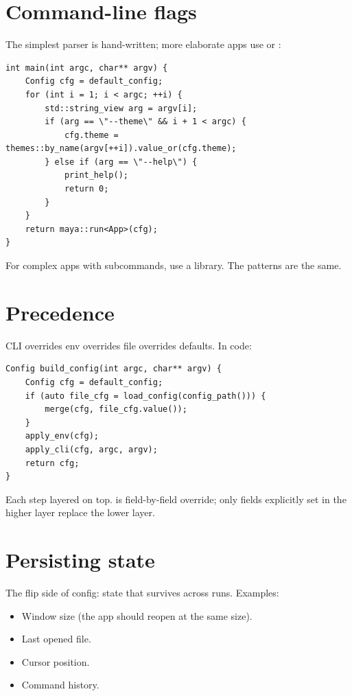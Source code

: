 \section{Command-line flags}

The simplest parser is hand-written; more elaborate apps use
 or :

\begin{lstlisting}
int main(int argc, char** argv) {
    Config cfg = default_config;
    for (int i = 1; i < argc; ++i) {
        std::string_view arg = argv[i];
        if (arg == \"--theme\" && i + 1 < argc) {
            cfg.theme = themes::by_name(argv[++i]).value_or(cfg.theme);
        } else if (arg == \"--help\") {
            print_help();
            return 0;
        }
    }
    return maya::run<App>(cfg);
}
\end{lstlisting}

For complex apps with subcommands, use a library. The patterns
are the same.

\section{Precedence}

CLI overrides env overrides file overrides defaults. In code:

\begin{lstlisting}
Config build_config(int argc, char** argv) {
    Config cfg = default_config;
    if (auto file_cfg = load_config(config_path())) {
        merge(cfg, file_cfg.value());
    }
    apply_env(cfg);
    apply_cli(cfg, argc, argv);
    return cfg;
}
\end{lstlisting}

Each step layered on top.  is field-by-field
override; only fields explicitly set in the higher layer
replace the lower layer.

\section{Persisting state}

The flip side of config: state that survives across runs.
Examples:

\begin{itemize}[leftmargin=*]
  \item Window size (the app should reopen at the same size).
  \item Last opened file.
  \item Cursor position.
  \item Command history.
\end{itemize}

